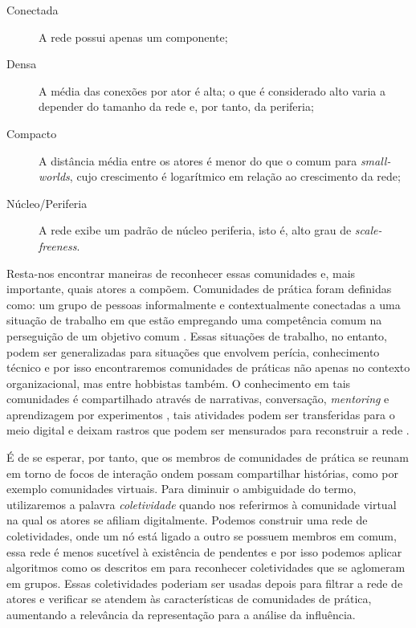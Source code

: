 \begin{description}
\item[Conectada] A rede possui apenas um componente;
\item[Densa] A média das conexões por ator é alta; o que é considerado
alto varia a depender do tamanho da rede e, por tanto, da periferia;
\item[Compacto] A distância média entre os atores é menor do que o comum para
\emph{small-worlds}, cujo crescimento é logarítmico em relação ao crescimento
da rede;
\item[Núcleo/Periferia] A rede exibe um padrão de núcleo periferia, isto é, alto
grau de \emph{scale-freeness}.
\end{description}

Resta-nos encontrar maneiras de reconhecer essas comunidades e, mais importante,
quais atores a compõem. Comunidades de prática foram definidas como: um grupo de
pessoas informalmente e contextualmente conectadas a uma situação de trabalho em
que estão empregando uma competência comum na perseguição de um objetivo comum
\citep{Wenger1999}. Essas situações de trabalho, no entanto, podem ser
generalizadas para situações que envolvem perícia, conhecimento técnico e por
isso encontraremos comunidades de práticas não apenas no contexto organizacional,
mas entre hobbistas também. O conhecimento em tais comunidades é compartilhado
através de narrativas, conversação, \emph{mentoring} e aprendizagem por
experimentos \citep{Brown1991, Lave1991a}, tais atividades podem ser
transferidas para o meio digital \citep{Hildreth1998, Kimble2001} e deixam
rastros que podem ser mensurados para reconstruir a rede
\citep{Tyler2005, Welser2007}.

É de se esperar, por tanto, que os membros de comunidades de prática se reunam
em torno de focos de interação ondem possam compartilhar histórias, como por
exemplo comunidades virtuais. Para diminuir o ambiguidade do termo, utilizaremos
a palavra \emph{coletividade} quando nos referirmos à comunidade virtual na
qual os atores se afiliam digitalmente. Podemos construir uma rede
de coletividades, onde um nó está ligado a outro se possuem membros em comum,
essa rede é menos sucetível à existência de pendentes e por isso podemos aplicar
algoritmos como os descritos em \citet{Palla2005} para reconhecer coletividades
que se aglomeram em grupos. Essas coletividades poderiam ser usadas depois para
filtrar a rede de atores e verificar se atendem às características de
comunidades de prática, aumentando a relevância da representação para a análise
da influência.

